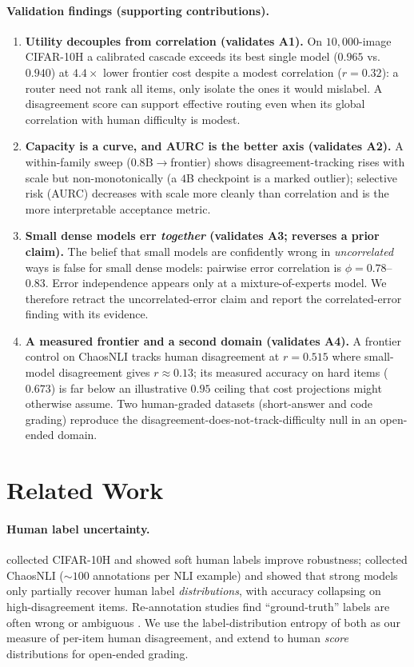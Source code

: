 \documentclass[letterpaper]{article} %
\begin{document}
\paragraph{Validation findings (supporting contributions).}
\begin{enumerate}\itemsep2pt
\item \textbf{Utility decouples from correlation (validates A1).} On
$10{,}000$-image CIFAR-10H a calibrated cascade exceeds its best single model
($0.965$ vs.\ $0.940$) at $4.4\times$ lower frontier cost despite a modest
correlation ($r{=}0.32$): a router need not rank all items, only isolate the ones
it would mislabel. A disagreement score can support effective routing even when
its global correlation with human difficulty is modest.
\item \textbf{Capacity is a curve, and AURC is the better axis (validates A2).}
A within-family sweep ($0.8$B$\to$frontier) shows disagreement-tracking rises with
scale but non-monotonically (a $4$B checkpoint is a marked outlier); selective
risk (AURC) decreases with scale more cleanly than correlation and is the more
interpretable acceptance metric.
\item \textbf{Small dense models err \emph{together} (validates A3; reverses a
prior claim).} The belief that small models are confidently wrong in
\emph{uncorrelated} ways is false for small dense models: pairwise error
correlation is $\phi{=}0.78$--$0.83$. Error independence appears only at a
mixture-of-experts model. We therefore retract the uncorrelated-error claim and
report the correlated-error finding with its evidence.
\item \textbf{A measured frontier and a second domain (validates A4).} A frontier
control on ChaosNLI tracks human disagreement at $r{=}0.515$ where small-model
disagreement gives $r{\approx}0.13$; its measured accuracy on hard items
($0.673$) is far below an illustrative $0.95$ ceiling that cost projections
might otherwise assume. Two
human-graded datasets (short-answer and code grading) reproduce the
disagreement-does-not-track-difficulty null in an open-ended domain.
\end{enumerate}

\section{Related Work}

\paragraph{Human label uncertainty.}
\citet{peterson2019human} collected CIFAR-10H and showed soft human labels improve
robustness; \citet{nie2020chaosnli} collected ChaosNLI (${\sim}100$ annotations per
NLI example) and showed that strong models only partially recover human label
\emph{distributions}, with accuracy collapsing on high-disagreement items.
Re-annotation studies find ``ground-truth'' labels are often wrong or ambiguous
\citep{northcutt2021pervasive, beyer2020imagenet}. We use the label-distribution
entropy of both as our measure of per-item human disagreement, and extend to human
\emph{score} distributions for open-ended grading.
\end{document}
